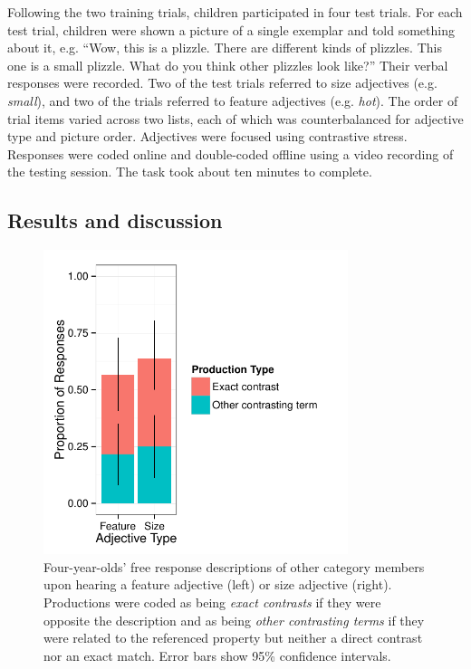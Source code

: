 \documentclass[man]{apa2}
\begin{document}
Following the two training trials, children participated in four test trials.  For each test trial, children were shown a picture of a single exemplar and told something about it, e.g. ``Wow, this is a plizzle. There are different kinds of plizzles. This one is a small plizzle.  What do you think other plizzles look like?'' Their verbal responses were recorded.  Two of the test trials referred to size adjectives (e.g. \emph{small}), and two of the trials referred to feature adjectives (e.g. \emph{hot}).  The order of trial items varied across two lists, each of which was counterbalanced for adjective type and picture order.  Adjectives were focused using contrastive stress. Responses were coded online and double-coded offline using a video recording of the testing session.  The task took about ten minutes to complete. 

\subsection{Results and discussion}

\begin{figure}[t] 
  \begin{center} 
    \includegraphics[width=3.5in]{figures/expt3.pdf} 
    \caption{\label{fig:freeResponse} Four-year-olds' free response descriptions of other category members upon hearing a feature adjective (left) or size adjective (right).  Productions were coded as being \emph{exact contrasts} if they were opposite the description and as being \emph{other contrasting terms} if they were related to the referenced property but neither a direct contrast nor an exact match. Error bars show 95\% confidence intervals. }
  \end{center} 
\end{figure}
\end{document}
